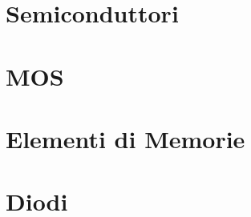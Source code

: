 \providecommand{\main}{.}







{\hypersetup{hidelinks}
  \tableofcontents  %
}

%

\clearpage
\chapter{Semiconduttori}

\clearpage
\chapter{MOS}

\clearpage
\chapter{Elementi di Memorie}

\clearpage
\chapter{Diodi}

\clearpage

%

\appendix
%



